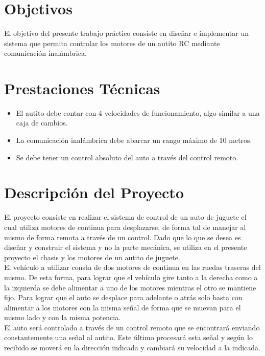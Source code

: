 \documentclass[a4paper,10pt]{article}
\title{  }
\begin{document}
	\maketitle %
	\newpage

	\tableofcontents %
	\newpage

	\section{Objetivos}
		El objetivo del presente trabajo práctico consiste en diseñar e implementar un sistema que permita controlar los motores de un autito RC mediante 
		comunicación inalámbrica. 

	\section{Prestaciones Técnicas}
		\begin{itemize}
			\item El autito debe contar con 4 velocidades de funcionamiento, algo similar a una caja de cambios.
			\item La comunicación inalámbrica debe abarcar un rango máximo de 10 metros. 
			\item Se debe tener un control absoluto del auto a través del control remoto.
		\end{itemize} 

	\section{Descripción del Proyecto}
		El proyecto consiste en realizar el sistema de control de un auto de juguete el cual utiliza motores de continua para desplazarse, de forma tal de manejar 
		al mismo de forma remota a través de un control. Dado que lo que se desea es diseñar y construir el sistema y no la parte mecánica, se utiliza en el presente
		proyecto  el chasis y los motores de un autito de juguete. \\
		\indent El vehículo a utilizar consta de dos motores de continua en las ruedas traseras del mismo. De esta forma, para lograr que el vehículo gire tanto
		a la derecha como a la izquierda se debe alimentar a uno de los motores mientras el otro se mantiene fijo. Para lograr que el auto se desplace para adelante
		o atrás solo basta con alimentar a los motores con la misma señal de forma que se muevan para el mismo lado y con la misma potencia. \\
		\indent El auto será controlado a través de un control remoto que se encontrará enviando constantemente una señal al autito. Este último procesará esta señal
		y según lo recibido se moverá en la dirección indicada y cambiará su velocidad a la indicada.
	
\end{document}
